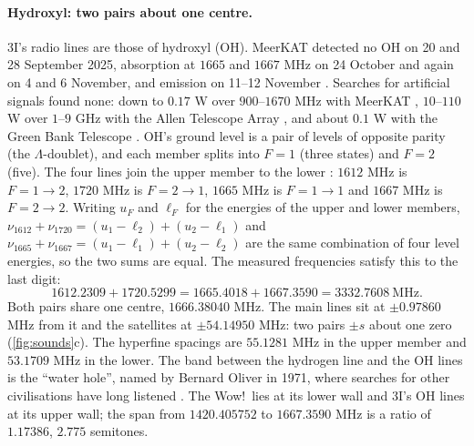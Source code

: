 \documentclass[11pt]{article}
\theoremstyle{definition}\newtheorem{definition}[theorem]{Definition}
\theoremstyle{remark}\newtheorem{remark}[theorem]{Remark}
\begin{document}
\paragraph{Hydroxyl: two pairs about one centre.} 3I's radio lines are those of hydroxyl (OH). MeerKAT detected no OH on 20 and 28 September 2025, absorption at $1665$ and $1667$ MHz on 24 October and again on 4 and 6 November, and emission on 11--12 November \cite{UCT,AstroBio,ATel}. Searches for artificial signals found none: down to $0.17$ W over $900$--$1670$ MHz with MeerKAT \cite{UCT}, $10$--$110$ W over $1$--$9$ GHz with the Allen Telescope Array \cite{Sheikh}, and about $0.1$ W with the Green Bank Telescope \cite{BL}. OH's ground level is a pair of levels of opposite parity (the $\Lambda$-doublet), and each member splits into $F=1$ (three states) and $F=2$ (five). The four lines join the upper member to the lower \cite{Jiang}: $1612$ MHz is $F=1\to2$, $1720$ MHz is $F=2\to1$, $1665$ MHz is $F=1\to1$ and $1667$ MHz is $F=2\to2$. Writing $u_F$ and $\ell_F$ for the energies of the upper and lower members, $\nu_{1612}+\nu_{1720}=(u_1-\ell_2)+(u_2-\ell_1)$ and $\nu_{1665}+\nu_{1667}=(u_1-\ell_1)+(u_2-\ell_2)$ are the same combination of four level energies, so the two sums are equal. The measured frequencies satisfy this to the last digit:
\[
1612.2309+1720.5299=1665.4018+1667.3590=3332.7608\ \text{MHz}.
\]
Both pairs share one centre, $1666.38040$ MHz. The main lines sit at $\pm0.97860$ MHz from it and the satellites at $\pm54.14950$ MHz: two pairs $\pm s$ about one zero (\cref{fig:sounds}c). The hyperfine spacings are $55.1281$ MHz in the upper member and $53.1709$ MHz in the lower. The band between the hydrogen line and the OH lines is the ``water hole'', named by Bernard Oliver in 1971, where searches for other civilisations have long listened \cite{WaterHole}. The Wow!\ lies at its lower wall and 3I's OH lines at its upper wall; the span from $1420.405752$ to $1667.3590$ MHz is a ratio of $1.17386$, $2.775$ semitones.
\end{document}
